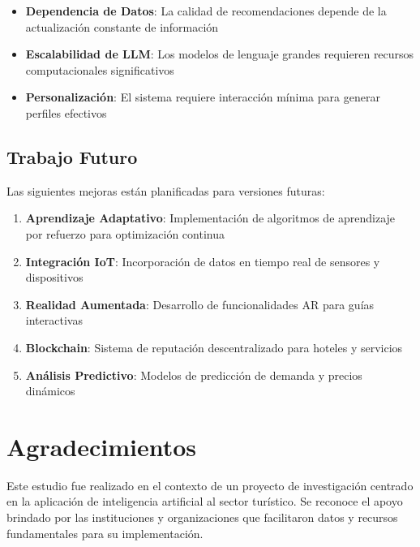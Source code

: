 \documentclass[runningheads]{llncs}
\begin{document}
\begin{itemize}
\item \textbf{Dependencia de Datos}: La calidad de recomendaciones depende de la actualización constante de información
\item \textbf{Escalabilidad de LLM}: Los modelos de lenguaje grandes requieren recursos computacionales significativos
\item \textbf{Personalización}: El sistema requiere interacción mínima para generar perfiles efectivos
\end{itemize}

\subsection{Trabajo Futuro}

Las siguientes mejoras están planificadas para versiones futuras:

\begin{enumerate}
\item \textbf{Aprendizaje Adaptativo}: Implementación de algoritmos de aprendizaje por refuerzo para optimización continua
\item \textbf{Integración IoT}: Incorporación de datos en tiempo real de sensores y dispositivos
\item \textbf{Realidad Aumentada}: Desarrollo de funcionalidades AR para guías interactivas
\item \textbf{Blockchain}: Sistema de reputación descentralizado para hoteles y servicios
\item \textbf{Análisis Predictivo}: Modelos de predicción de demanda y precios dinámicos
\end{enumerate}

\section{Agradecimientos}

Este estudio fue realizado en el contexto de un proyecto de investigación centrado en la aplicación de inteligencia artificial al sector turístico. Se reconoce el apoyo brindado por las instituciones y organizaciones que facilitaron datos y recursos fundamentales para su implementación.
\end{document}
